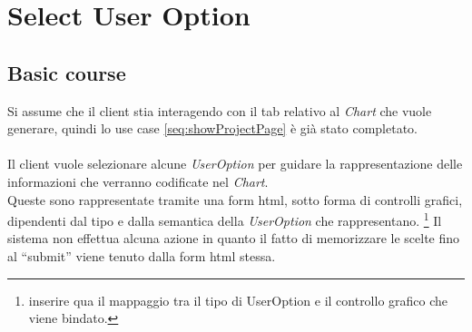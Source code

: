 \section{Select User Option}
\label{seq:selectUserOption}
\subsection{Basic course}
Si assume che il client stia interagendo con il tab relativo al \emph{Chart}
che vuole generare, quindi lo use case \ref{seq:showProjectPage} \`e gi\`a
stato completato. \\\\
Il client vuole selezionare alcune \emph{UserOption} per guidare la
rappresentazione delle informazioni che verranno codificate nel \emph{Chart}.\\
Queste sono rappresentate tramite una form html, sotto forma di controlli
grafici, dipendenti dal tipo e dalla semantica della \emph{UserOption} che
rappresentano. \footnote{inserire qua il mappaggio tra il tipo di UserOption e
il controllo grafico che viene bindato.}
Il sistema non effettua alcuna azione in quanto il fatto di memorizzare le
scelte fino al ``submit'' viene tenuto dalla form html stessa.
